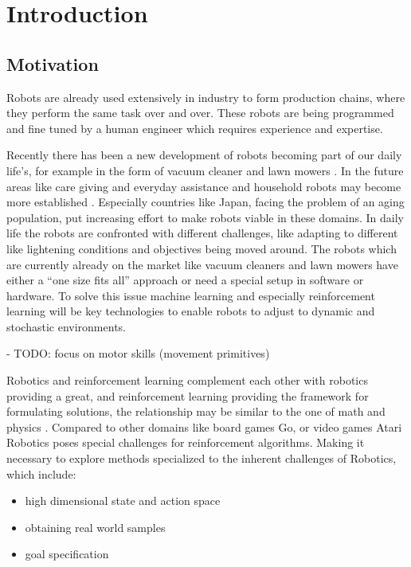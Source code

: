 
\chapter{Introduction}

\section{Motivation}
Robots are already used extensively in industry to form production chains,
where they perform the same task over and over.
These robots are being programmed and fine tuned
by a human engineer which requires experience and expertise. \par
Recently there has been a new development of robots
becoming part of our daily life's, for example in the form of 
vacuum cleaner and lawn mowers . In the future areas like care giving and
everyday assistance and household robots may
become more established \citet{schaal2007new}.
Especially countries like Japan, facing the problem of an
aging population, put increasing effort to make robots
viable in these domains. 
In daily life the robots are confronted with different challenges,
like  adapting to different like lightening conditions and
objectives being moved around.
The robots which are currently already on the market
like vacuum cleaners and lawn mowers have
either a ``one size fits all'' approach or need a special setup
in software or hardware. To solve this issue
machine learning and especially
reinforcement learning will be key technologies to enable robots
to adjust to dynamic and stochastic environments.

- TODO: focus on motor skills (movement primitives)

Robotics and reinforcement learning complement each other
with robotics providing a great, and reinforcement learning providing
the framework for formulating solutions, the 
relationship may be similar to the one of  math and physics
\citet{kober2013reinforcement}.
Compared to other domains like board games Go, or video games Atari
Robotics  poses special challenges for reinforcement algorithms. Making
it necessary to explore methods specialized to the inherent
challenges of Robotics, which include:

\begin{itemize}
\item high dimensional state and action space
\item obtaining real world samples
\item goal specification
\end{itemize}

